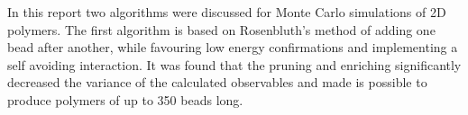 In this report two algorithms were discussed for Monte Carlo simulations of 2D polymers. The first algorithm is based on Rosenbluth's method of adding one bead after another, while favouring low energy confirmations and implementing a self avoiding interaction. It was found that the pruning and enriching significantly decreased the variance of the calculated observables and made is possible to produce polymers of up to 350 beads long.